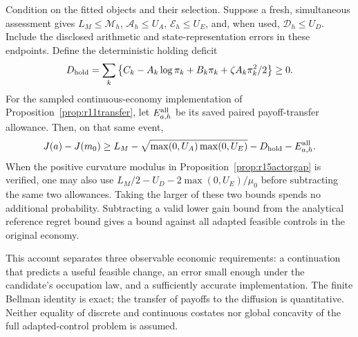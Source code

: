 \begin{theorem}
\label{thm:r15mechanism}
Condition on the fitted objects and their selection. Suppose a fresh,
simultaneous assessment gives $L_M\leq\mathcal M_h$,
$\mathcal A_h\leq U_A$, $\mathcal E_h\leq U_E$, and, when used,
$\mathcal D_h\leq U_D$. Include the disclosed arithmetic and
state-representation errors in these endpoints. Define the deterministic
holding deficit
\[
 D_{\rm hold}=\sum_k\left\{C_k-A_k\log\pi_k+B_k\pi_k
                                      +\zeta A_k\pi_k^2/2\right\}\geq0.
\]
For the sampled continuous-economy implementation of
Proposition~\ref{prop:r11transfer}, let $E_{a,h}^{\rm all}$ be its
saved paired payoff-transfer allowance. Then, on that same event,
\begin{equation}
 J(a)-J(m_0)\geq
 L_M-\sqrt{\max(0,U_A)\max(0,U_E)}
                  -D_{\rm hold}-E_{a,h}^{\rm all}.
 \label{eq:r15economicgain}
\end{equation}
When the positive curvature modulus in
Proposition~\ref{prop:r15actorgap} is verified, one may also use
$L_M/2-U_D-2\max(0,U_E)/\mu_0$ before subtracting the same two
allowances. Taking the larger of these two bounds spends no additional
probability. Subtracting a valid lower gain bound from the analytical
reference regret bound gives a bound against all adapted feasible
controls in the original economy.
\end{theorem}

This account separates three observable economic requirements: a
continuation that predicts a useful feasible change, an error small
enough under the candidate's occupation law, and a sufficiently accurate
implementation. The finite Bellman identity is exact; the transfer of
payoffs to the diffusion is quantitative. Neither equality of discrete
and continuous costates nor global concavity of the full adapted-control
problem is assumed.
